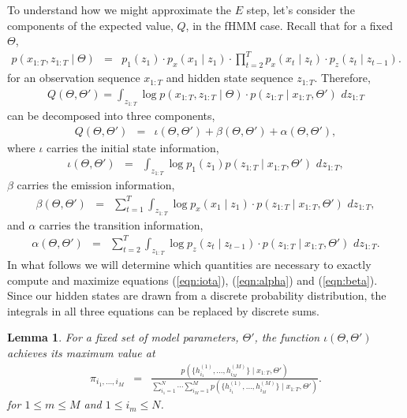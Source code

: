 \documentclass{amsart}
\newtheorem{lemma}[theorem]{Lemma}
\begin{document}
To understand how we might approximate the $E$ step, let's consider the components of the expected value, $Q$, in the fHMM case.  Recall that for a fixed $\Theta$,  
\begin{eqnarray*}
p(x_{1:T},z_{1:T}\mid \Theta) & = & p_1(z_1)\cdot p_x(x_1\mid z_1)\cdot \prod_{t=2}^Tp_x(x_t\mid z_t)\cdot p_z(z_t\mid z_{t-1}).  
\end{eqnarray*}
for an observation sequence $x_{1:T}$ and hidden state sequence $z_{1:T}$. Therefore, 
\begin{eqnarray*}
Q(\Theta,\Theta') = \int_{z_{1:T}}\log p(x_{1:T},z_{1:T}\mid \Theta) \cdot p(z_{1:T}\mid x_{1:T},\Theta')\,\,dz_{1:T}
\end{eqnarray*}
can be decomposed into three components, 
\begin{eqnarray*}
Q(\Theta,\Theta') &=& \iota(\Theta,\Theta')+\beta(\Theta,\Theta')+\alpha(\Theta,\Theta'), 
\end{eqnarray*}
where $\iota$ carries the initial state information,
\begin{eqnarray}\label{eqn:iota}
\iota(\Theta,\Theta') &=& \int_{z_{1:T}}\log p_1(z_1)p(z_{1:T}\mid x_{1:T},\Theta')\,\,dz_{1:T},
\end{eqnarray}
$\beta$ carries the emission information,
\begin{eqnarray}\label{eqn:beta}
\beta(\Theta,\Theta') &=& \sum_{t=1}^T\int_{z_{1:T}}\log p_x(x_1\mid z_1)\cdot p(z_{1:T}\mid x_{1:T},\Theta')\,\,dz_{1:T},
\end{eqnarray}
and $\alpha$ carries the transition information,
\begin{eqnarray}\label{eqn:alpha}
\alpha(\Theta,\Theta') &=& \sum_{t=2}^T\int_{z_{1:T}}\log p_z(z_t\mid z_{t-1})\cdot p(z_{1:T}\mid x_{1:T},\Theta')\,\,dz_{1:T}.
\end{eqnarray}
In what follows we will determine which quantities are necessary to exactly compute and maximize equations (\ref{eqn:iota}), (\ref{eqn:alpha}) and (\ref{eqn:beta}).  Since our hidden states are drawn from a discrete probability distribution, the integrals in all three equations can be replaced by discrete sums.

\begin{lemma}
For a fixed set of model parameters, $\Theta'$, the function $\iota(\Theta,\Theta')$ achieves its maximum value at
\begin{eqnarray*}
\pi_{i_1,...,i_M} &=&\frac{p(\{h_{i_1}^{(1)},...,h_{i_M}^{(M)}\}\mid x_{1:T},\Theta')}{\sum_{i_1=1}^N\cdots \sum_{i_M=1}^M p(\{h_{i_1}^{(1)},...,h_{i_M}^{(M)}\}\mid x_{1:T},\Theta')}.
\end{eqnarray*}
for $1\leq m\leq M$ and $1\leq i_m\leq N$.
\end{lemma}
\end{document}

